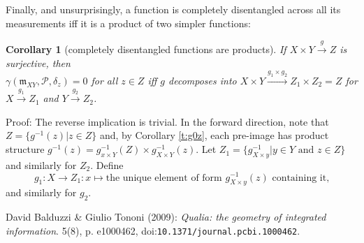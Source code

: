 \documentclass[12pt]{article}
\newcommand{\fm}{{\mathfrak m}}
\newcommand{\cP}{{\mathcal P}}
\newtheorem{cor}[thm]{Corollary}
\theoremstyle{remark}
\begin{document}
Finally, and unsurprisingly, a function is completely 
disentangled across all its measurements iff it is a 
product of two simpler functions:

\begin{cor}
	[completely disentangled functions are products]
	\label{t:g0}
	If $X\times Y\xrightarrow{g}Z$ is surjective, then\\
	$\gamma(\fm_{XY},\cP,\delta_z)=0$ for all $z\in Z$ iff $g$ 
    decomposes into $X\times Y\xrightarrow{g_1\times g_2}
    Z_1\times Z_2=Z$ for $X\xrightarrow{g_1}Z_1$ and 
    $Y\xrightarrow{g_2}Z_2$.
\end{cor}

\noindent
Proof:
The reverse implication is trivial.
In the forward direction, note that $Z=\{g^{-1}(z)|z\in Z\}$ 
and, by Corollary \ref{t:g0z}, each pre-image has product 
structure $g^{-1}(z)=g^{-1}_{x\times Y}(Z)\times 
g^{-1}_{X\times Y}(z)$. Let $Z_1=\{g^{-1}_{X\times y}
|y\in Y\mbox{ and }z\in Z\}$ and similarly for $Z_2$. Define 
\begin{equation*}
	g_1:X\rightarrow Z_1:x\mapsto \mbox{the unique element of 
    form }g^{-1}_{X\times y}(z)
	\mbox{ containing it,}
\end{equation*}
and similarly for $g_2$.

\begin{thebibliography}{10}
\providecommand{\urlprefix}{Available at }
\providecommand{\url}[1]{\texttt{#1}}
\providecommand{\href}[2]{\texttt{#2}}
\providecommand{\urlalt}[2]{\href{#1}{#2}}
\providecommand{\doi}[1]{doi:\urlalt{http://dx.doi.org/#1}{#1}}
\providecommand{\bibinfo}[2]{#2}

\bibinfo{author}{David Balduzzi} \& \bibinfo{author}{Giulio Tononi}
  (\bibinfo{year}{2009}): \emph{\bibinfo{title}{Qualia: the geometry of
  integrated information}}.
\newblock {\sl \bibinfo{journal}{PLoS Comput Biol}}
  \bibinfo{volume}{5}(\bibinfo{number}{8}), p. \bibinfo{pages}{e1000462},
  \doi{10.1371/journal.pcbi.1000462}.
  
\end{thebibliography}
\end{document}
